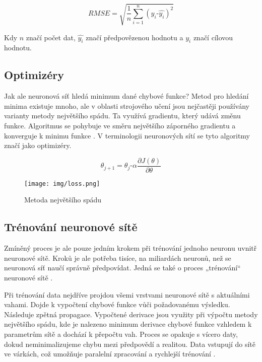 \documentclass[FM,DP]{tulthesis}
\begin{document}
		\begin{equation}
			RMSE = \sqrt{\frac{1}{n}\sum_{i=1}^{n}(y_i ‑ \hat{y_i})^2}
		\end{equation}
		
		Kdy $n$ značí počet dat, $\hat{y_i}$ značí předpovězenou hodnotu a $y_i$ značí cílovou hodnotu.
		
		\subsection{Optimizéry}
		Jak ale neuronová síť hledá minimum dané chybové funkce? Metod pro hledání minima existuje mnoho, ale v oblasti strojového učení jsou nejčastěji používány varianty metody největšího spádu. Ta využívá gradientu, který udává změnu funkce. Algoritmus se pohybuje ve směru největšího záporného gradientu a konverguje k minimu funkce \cite{gradient_descent}. V terminologii neuronových sítí se tyto algoritmy značí jako optimizéry.
		

		\begin{equation}
			\theta_{j+1} = \theta_j ‑ \alpha \frac{\partial J(\theta)}{\partial \theta}
		\end{equation}

	
		\begin{figure}[H]
			\centering
			\texttt{[image: img/loss.png]}
			\caption{Metoda největšího spádu \cite{general}}
			\label{fig:sgd}
		\end{figure}
		
		\subsection{Trénování neuronové sítě}
		Zmíněný proces je ale pouze jedním krokem při trénování jednoho neuronu uvnitř neuronové sítě. Kroků je ale potřeba tisíce, na miliardách neuronů, než se neuronová síť naučí správně předpovídat. Jedná se také o proces „trénování“ neuronové sítě \cite{tds_train}.
		
		Při trénování data nejdříve projdou všemi vrstvami neuronové sítě s aktuálními vahami. Dojde k vypočtení chybové funkce vůči požadovanému výsledku. Následuje zpětná propagace. Vypočtené derivace jsou využity při výpočtu metody největšího spádu, kde je nalezeno minimum derivace chybové funkce vzhledem k parametrům sítě a dochází k přepočtu vah. Proces se opakuje s vícero daty, dokud neminimalizujeme chybu mezi předpovědí a realitou. Data vstupují do sítě ve várkách, což umožňuje paralelní zpracování a rychlejší trénování \cite{tds_train}. 
		
\end{document}
